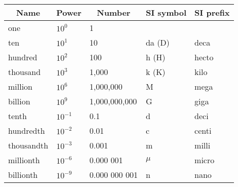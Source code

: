 \begin{table}[ht]
\begin{tabular}{|l|l|l|l|l|}
\hline
\multicolumn{1}{|c|}{\textbf{Name}} & \multicolumn{1}{c|}{\textbf{Power}} & \multicolumn{1}{c|}{\textbf{Number}} & \multicolumn{1}{c|}{\textbf{SI symbol}} & \multicolumn{1}{c|}{\textbf{SI prefix}} \\ \hline
one                                 & $10^0$& 1                                    &                                         &                                         \\ \hline
ten                                 & $10^1$                                   & 10                                   & da (D)                                  & deca                                    \\ \hline
hundred                             & $10^2$                                   & 100                                  & h (H)                                   & hecto                                   \\ \hline
thousand                            & $10^3$                                  & 1,000                                & k (K)                                   & kilo                                    \\ \hline
million                             & $10^6$                                   & 1,000,000                            & M                                       & mega                                    \\ \hline
billion                             & $10^9$                                  & 1,000,000,000                        & G                                       & giga                                    \\ \hline
tenth                               & $10^{-1}$                                 & 0.1                                  & d                                       & deci                                    \\ \hline
hundredth                           & $10^{-2}$                                  & 0.01                                 & c                                       & centi                                   \\ \hline
thousandth                          & $10^{-3} $                                 & 0.001                                & m                                       & milli                                   \\ \hline
millionth                           &$10^{-6} $                               & 0.000 001                            & $\mu$                                      & micro                                   \\ \hline
billionth                           & $10^{-9} $                               & 0.000 000 001                        & n                                       & nano                                    \\ \hline
\end{tabular}
\end{table}

